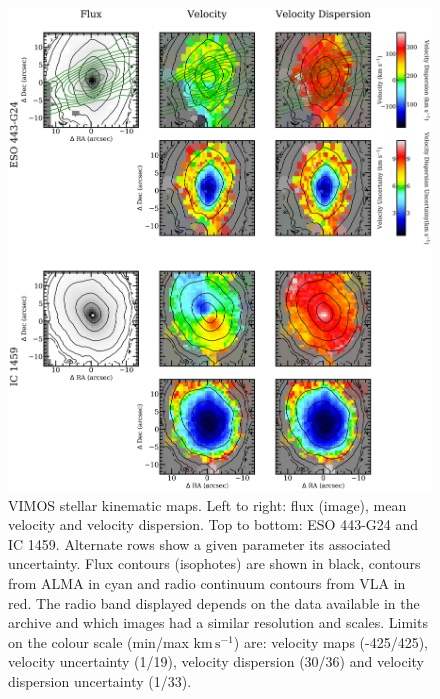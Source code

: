 		\begin{figure}
			\centering
			\includegraphics[height=0.62\textheight]{chapter4/vimos/kin1.png}
			\caption[VIMOS stellar kinematic maps]{VIMOS stellar kinematic maps. Left to right: flux (image), mean velocity and velocity dispersion. Top to bottom: ESO 443-G24 and IC 1459. Alternate rows show a given parameter its associated uncertainty. Flux contours (isophotes) are shown in black,  contours from ALMA in cyan and radio continuum contours from VLA in red. The radio band displayed depends on the data available in the archive and which images had a similar resolution and scales. Limits on the colour scale (min/max $\mathrm{km \, s^{-1}}$) are: velocity maps (-425/425), velocity uncertainty (1/19), velocity dispersion (30/36) and velocity dispersion uncertainty (1/33).} 
			\label{fig:VIMOS_stellar}
		\end{figure}

